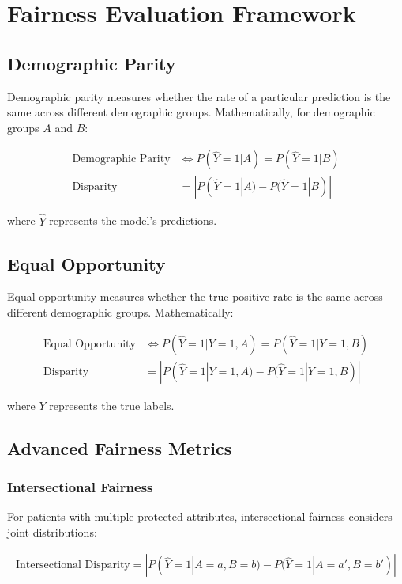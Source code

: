\documentclass[12pt]{article}
\begin{document}
\section{Fairness Evaluation Framework}

\subsection{Demographic Parity}

Demographic parity measures whether the rate of a particular prediction is the same across different demographic groups. Mathematically, for demographic groups $A$ and $B$:

\begin{align}
\text{Demographic Parity} &\iff P(\hat{Y}=1|A) = P(\hat{Y}=1|B)\\
\text{Disparity} &= |P(\hat{Y}=1|A) - P(\hat{Y}=1|B)|
\end{align}

where $\hat{Y}$ represents the model's predictions.

\subsection{Equal Opportunity}

Equal opportunity measures whether the true positive rate is the same across different demographic groups. Mathematically:

\begin{align}
\text{Equal Opportunity} &\iff P(\hat{Y}=1|Y=1,A) = P(\hat{Y}=1|Y=1,B)\\
\text{Disparity} &= |P(\hat{Y}=1|Y=1,A) - P(\hat{Y}=1|Y=1,B)|
\end{align}

where $Y$ represents the true labels.

\subsection{Advanced Fairness Metrics}

\subsubsection{Intersectional Fairness}

For patients with multiple protected attributes, intersectional fairness considers joint distributions:

\begin{align}
\text{Intersectional Disparity} = |P(\hat{Y}=1|A=a, B=b) - P(\hat{Y}=1|A=a', B=b')|
\end{align}
\end{document}
